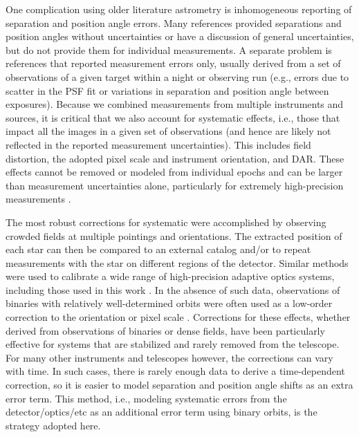 \documentclass[twocolumn]{aastex62}
\begin{document}
One complication using older literature astrometry is inhomogeneous reporting of separation and position angle errors. Many references provided separations and position angles without uncertainties or have a discussion of general uncertainties, but do not provide them for individual measurements. A separate problem is references that reported measurement errors only, usually derived from a set of observations of a given target within a night or observing run (e.g., errors due to scatter in the PSF fit or variations in separation and position angle between exposures). Because we combined measurements from multiple instruments and sources, it is critical that we also account for systematic effects, i.e., those that impact all the images in a given set of observations (and hence are likely not reflected in the reported measurement uncertainties). This includes field distortion, the adopted pixel scale and instrument orientation, and DAR. These effects cannot be removed or modeled from individual epochs and can be larger than measurement uncertainties alone, particularly for extremely high-precision measurements \citep[e.g.,][]{2009ApJ...690.1463L}.

The most robust corrections for systematic were accomplished by observing crowded fields at multiple pointings and orientations. The extracted position of each star can then be compared to an external catalog and/or to repeat measurements with the star on different regions of the detector. Similar methods were used to calibrate a wide range of high-precision adaptive optics systems, including those used in this work \citep{Yelda2010, 2016PASP..128i5004S, 2015MNRAS.453.3234P}. In the absence of such data, observations of binaries with relatively well-determined orbits were often used as a low-order correction to the orientation or pixel scale \citep[e.g.,][]{Tok2015c}. Corrections for these effects, whether derived from observations of binaries or dense fields, have been particularly effective for systems that are stabilized and rarely removed from the telescope. For many other instruments and telescopes however, the corrections can vary with time. In such cases, there is rarely enough data to derive a time-dependent correction, so it is easier to model separation and position angle shifts as an extra error term. This method, i.e., modeling systematic errors from the detector/optics/etc as an additional error term using binary orbits, is the strategy  adopted here.
\end{document}
